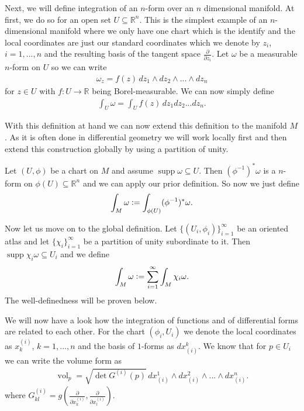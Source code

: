 \documentclass[12pt,a4paper]{article}
\numberwithin{equation}{subsection}
\numberwithin{lemma}{subsection}
\theoremstyle{definition}
\DeclareMathOperator{\supp}{supp}
\DeclareMathOperator{\vol}{vol}
\newcommand{\real}{\mathbb{R}}
\begin{document}
Next, we will define integration of an $n$-form over an $n$ dimensional 
manifold. At first, we do so for an open set $U \subseteq \real^n$.
This is the simplest example of an $n$-dimensional manifold where 
we only have one chart which is the identify and the local coordinates are 
just our standard coordinates which we denote by $z_i$, $i=1,...,n$ and the 
resulting basis of the tangent space $\frac{\partial}{\partial z_i}$. 
Let $\omega$ be a measurable 
$n$-form on $U$ so we can 
write 
\begin{align*}
    \omega_z = f(z)\, dz_1 \wedge dz_2 \wedge ... \wedge dz_n
\end{align*}
for $z \in U$ with $f:U \rightarrow \real$ being Borel-measurable. 
We can now simply define 
\begin{align*}
    \int_U \omega = \int_U f(z) \, dz_1 dz_2 ... dz_n.
\end{align*}

With this definition at hand we can now extend this definition to 
the manifold $M$. As it is often done in 
differential geometry we will work locally first and then extend this 
construction globally by using a partition of unity.

Let $(U,\phi)$ be a chart on $M$ and assume $\supp \omega \subseteq U$. 
Then $(\phi^{-1})^* \omega$
is a $n$-form on $\phi(U) \subseteq \real^n$ and 
we can apply our prior definition. So now we just define 
\begin{align*}
    \int_M \omega \vcentcolon= \int_{\phi(U)} (\phi^{-1})^* \omega.
\end{align*}

Now let us move on to the global definition. Let $\{(U_i,\phi_i)\}_{i=1}^\infty$
be an oriented atlas and let $\{ \chi_i \}_{i=1}^\infty$ be a partition 
of unity subordinate to it. 
Then $\supp \chi_i \omega \subseteq U_i$ 
and we define 
\begin{align*}
    \int_M \omega \vcentcolon= \sum_{i=1}^\infty \int_M \chi_i \omega.
\end{align*} 
The well-definedness will be proven below.

We will now have a look how the integration of functions and of 
differential forms are related to each other. 
For the chart $(\phi_i, U_i)$ we denote the local coordinates as 
$x^{(i)}_k$, $k=1,...,n$ and the basis of $1$-forms as $dx_{(i)}^k$.
We know that for $p \in U_i$ we can write the volume form as
\begin{align*}
    \vol_p = \sqrt{ \det G^{(i)}(p)} \,
        dx_{(i)}^1 \wedge dx_{(i)}^2 \wedge ... \wedge dx_{(i)}^n.
\end{align*}
where $G^(i)_{kl} = g(\frac{\partial}{\partial x^{(i)}_k},\frac{\partial}{\partial x^{(i)}_l} )$.
\end{document}
